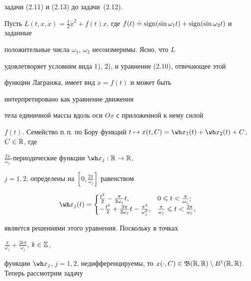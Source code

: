 задачи (2.11) и (2.13) до задачи~(2.12).





\begin{exams}


Пусть $L(t,x,\Dot x)=\frac{1}{2}{\Dot


x}^2+f(t)x$, где $f(t)\doteq\sign(\sin{\omega_1


t})+\sign(\sin{\omega_2 t})$ и заданные


положительные числа $\omega_1$, $\omega_2$ несоизмеримы. Ясно, что $L$


удовлетворяет условиям вида 1), 2), и уравнение (2.10), отвечающее этой


функции Лагранжа, имеет вид $\ddot x=f(t)$ и может быть


интерпретировано как уравнение движения


тела единичной массы вдоль оси $Ox$ с приложенной к нему силой


$f(t)$. Семейство п.\,п. по Бору функций $t\mapsto


x(t,C)=\wh x_1(t)+\wh x_2(t)+C$, $C\in\Bbb R$, где


$\frac{2\pi}{\omega_j}$-периодические функции $\wh x_j:\Bbb R\to\Bbb R$,


$j=1,2$, определены на $[0,\frac{2\pi}{\omega_j}]$ равенством


\begin{equation}


\wh x_j(t)=\begin{cases} \frac{t^2}{2}-\frac{\pi}{2\omega_j}t,& 0\leqslant


t<\frac{\pi}{\omega_j};\\


-\frac{t^2}{2}+\frac{3\pi}{2\omega_j}t-\frac{\pi^2}{\omega_j^2},


& \frac{\pi}{\omega_j}\leqslant t<\frac{2\pi}{\omega_j},


\end{cases}


\end{equation}


является решениями этого уравнения. Поскольку в точках


$\frac{\pi}{\omega_j}+\frac{2k\pi}{\omega_j}$, $k\in{\Bbb Z}$,


функции $\wh x_j$, $j=1, 2$, недифференцируемы, то $x(\cdot,C)\in\frak


B(\Bbb R,\Bbb R)\setminus B^1(\Bbb R,\Bbb R)$. Теперь рассмотрим задачу



\end{exams}
